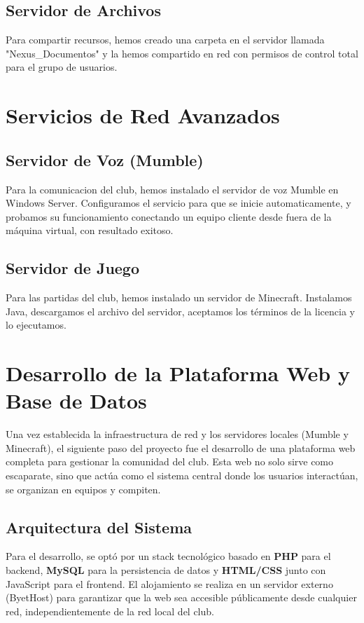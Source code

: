 \documentclass{article}
\begin{document}
\subsection{Servidor de Archivos}
Para compartir recursos, hemos creado una carpeta en el servidor llamada "Nexus\_Documentos" y la hemos compartido en red con permisos de control total para el grupo de usuarios.

\section{Servicios de Red Avanzados}

\subsection{Servidor de Voz (Mumble)}
Para la comunicacion del club, hemos instalado el servidor de voz Mumble en Windows Server. Configuramos el servicio para que se inicie automaticamente, y probamos su funcionamiento conectando un equipo cliente desde fuera de la máquina virtual, con resultado exitoso.

\subsection{Servidor de Juego}
Para las partidas del club, hemos instalado un servidor de Minecraft. Instalamos Java, descargamos el archivo del servidor, aceptamos los términos de la licencia y lo ejecutamos.

\section{Desarrollo de la Plataforma Web y Base de Datos}

Una vez establecida la infraestructura de red y los servidores locales (Mumble y Minecraft), el siguiente paso del proyecto fue el desarrollo de una plataforma web completa para gestionar la comunidad del club. Esta web no solo sirve como escaparate, sino que actúa como el sistema central donde los usuarios interactúan, se organizan en equipos y compiten.

\subsection{Arquitectura del Sistema}
Para el desarrollo, se optó por un stack tecnológico basado en \textbf{PHP} para el backend, \textbf{MySQL} para la persistencia de datos y \textbf{HTML/CSS} junto con JavaScript para el frontend. El alojamiento se realiza en un servidor externo (ByetHost) para garantizar que la web sea accesible públicamente desde cualquier red, independientemente de la red local del club.
\end{document}
